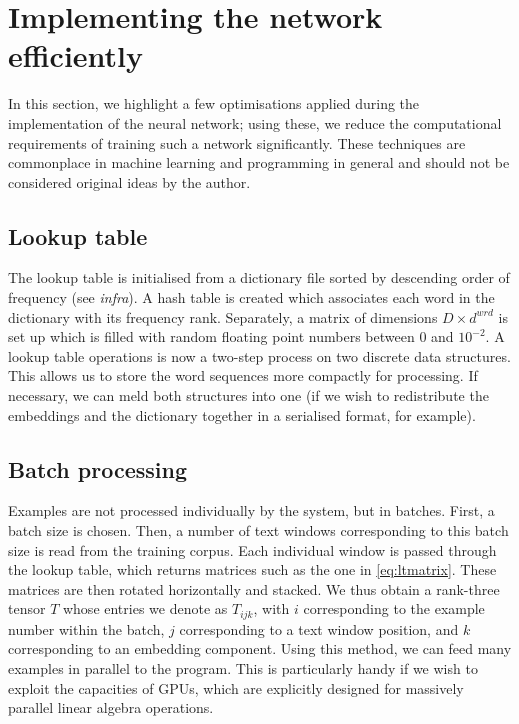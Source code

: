 \section{Implementing the network efficiently}
\label{sec:implementation}

In this section, we highlight a few optimisations applied during the
implementation of the neural network; using these, we reduce the
computational requirements of training such a network
significantly. These techniques are commonplace in machine learning
and programming in general and should not be considered original ideas
by the author.

\subsection{Lookup table}
\label{sec:ltable}
The lookup table is initialised from a dictionary file sorted by
descending order of frequency (see \textit{infra}). A hash table is
created which associates each word in the dictionary with its
frequency rank. Separately, a matrix of dimensions $D \times d^{wrd}$
is set up which is filled with random floating point numbers between
$0$ and $10^{-2}$. A lookup table operations is now a two-step process
on two discrete data structures. This allows us to store the word
sequences more compactly for processing. If necessary, we can meld
both structures into one (if we wish to redistribute the embeddings
and the dictionary together in a serialised format, for example).

\subsection{Batch processing}
\label{sec:batch}
Examples are not processed individually by the system, but in
batches. First, a batch size is chosen. Then, a number of text windows
corresponding to this batch size is read from the training
corpus. Each individual window is passed through the lookup table,
which returns matrices such as the one in \ref{eq:ltmatrix}. These
matrices are then rotated horizontally and stacked. We thus obtain a
rank-three tensor $T$ whose entries we denote as $T_{ijk}$, with $i$
corresponding to the example number within the batch, $j$
corresponding to a text window position, and $k$ corresponding to an
embedding component. Using this method, we can feed many examples in
parallel to the program. This is particularly handy if we wish to
exploit the capacities of GPUs, which are explicitly designed for
massively parallel linear algebra operations.

